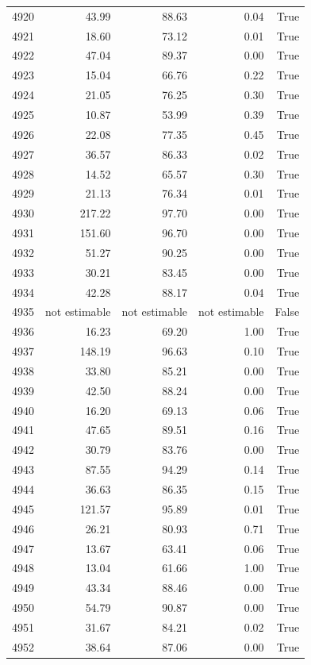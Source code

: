 \begin{longtable}{rrrrr}
4920 & 43.99 & 88.63 & 0.04 & True \\
4921 & 18.60 & 73.12 & 0.01 & True \\
4922 & 47.04 & 89.37 & 0.00 & True \\
4923 & 15.04 & 66.76 & 0.22 & True \\
4924 & 21.05 & 76.25 & 0.30 & True \\
4925 & 10.87 & 53.99 & 0.39 & True \\
4926 & 22.08 & 77.35 & 0.45 & True \\
4927 & 36.57 & 86.33 & 0.02 & True \\
4928 & 14.52 & 65.57 & 0.30 & True \\
4929 & 21.13 & 76.34 & 0.01 & True \\
4930 & 217.22 & 97.70 & 0.00 & True \\
4931 & 151.60 & 96.70 & 0.00 & True \\
4932 & 51.27 & 90.25 & 0.00 & True \\
4933 & 30.21 & 83.45 & 0.00 & True \\
4934 & 42.28 & 88.17 & 0.04 & True \\
4935 & not estimable & not estimable & not estimable & False \\
4936 & 16.23 & 69.20 & 1.00 & True \\
4937 & 148.19 & 96.63 & 0.10 & True \\
4938 & 33.80 & 85.21 & 0.00 & True \\
4939 & 42.50 & 88.24 & 0.00 & True \\
4940 & 16.20 & 69.13 & 0.06 & True \\
4941 & 47.65 & 89.51 & 0.16 & True \\
4942 & 30.79 & 83.76 & 0.00 & True \\
4943 & 87.55 & 94.29 & 0.14 & True \\
4944 & 36.63 & 86.35 & 0.15 & True \\
4945 & 121.57 & 95.89 & 0.01 & True \\
4946 & 26.21 & 80.93 & 0.71 & True \\
4947 & 13.67 & 63.41 & 0.06 & True \\
4948 & 13.04 & 61.66 & 1.00 & True \\
4949 & 43.34 & 88.46 & 0.00 & True \\
4950 & 54.79 & 90.87 & 0.00 & True \\
4951 & 31.67 & 84.21 & 0.02 & True \\
4952 & 38.64 & 87.06 & 0.00 & True \\

\end{longtable}
